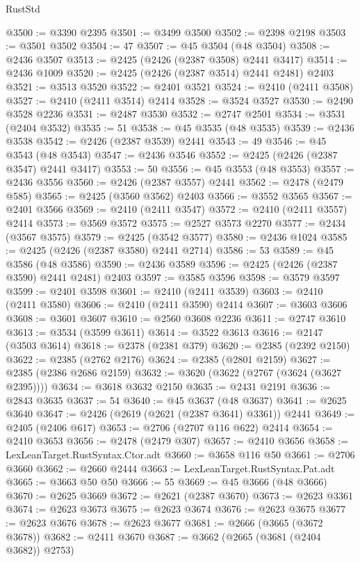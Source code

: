 \begin{lexlean}{RustStd}
\begin{coremodule}
@3500 := @3390 @2395
@3501 := @3499 @3500
@3502 := @2398 @2198
@3503 := @3501 @3502
@3504 := 47
@3507 := @45 @3504 (@48 @3504)
@3508 := @2436 @3507
@3513 := @2425 (@2426 (@2387 @3508) @2441 @3417)
@3514 := @2436 @1009
@3520 := @2425 (@2426 (@2387 @3514) @2441 @2481) @2403
@3521 := @3513 @3520
@3522 := @2401 @3521
@3524 := @2410 (@2411 @3508)
@3527 := @2410 (@2411 @3514) @2414
@3528 := @3524 @3527
@3530 := @2490 @3528 @2236
@3531 := @2487 @3530
@3532 := @2747 @2501
@3534 := @3531 (@2404 @3532)
@3535 := 51
@3538 := @45 @3535 (@48 @3535)
@3539 := @2436 @3538
@3542 := @2426 (@2387 @3539) @2441
@3543 := 49
@3546 := @45 @3543 (@48 @3543)
@3547 := @2436 @3546
@3552 := @2425 (@2426 (@2387 @3547) @2441 @3417)
@3553 := 50
@3556 := @45 @3553 (@48 @3553)
@3557 := @2436 @3556
@3560 := @2426 (@2387 @3557) @2441
@3562 := @2478 (@2479 @585)
@3565 := @2425 (@3560 @3562) @2403
@3566 := @3552 @3565
@3567 := @2401 @3566
@3569 := @2410 (@2411 @3547)
@3572 := @2410 (@2411 @3557) @2414
@3573 := @3569 @3572
@3575 := @2527 @3573 @2270
@3577 := @2434 (@3567 @3575)
@3579 := @2425 (@3542 @3577)
@3580 := @2436 @1024
@3585 := @2425 (@2426 (@2387 @3580) @2441 @2714)
@3586 := 53
@3589 := @45 @3586 (@48 @3586)
@3590 := @2436 @3589
@3596 := @2425 (@2426 (@2387 @3590) @2441 @2481) @2403
@3597 := @3585 @3596
@3598 := @3579 @3597
@3599 := @2401 @3598
@3601 := @2410 (@2411 @3539)
@3603 := @2410 (@2411 @3580)
@3606 := @2410 (@2411 @3590) @2414
@3607 := @3603 @3606
@3608 := @3601 @3607
@3610 := @2560 @3608 @2236
@3611 := @2747 @3610
@3613 := @3534 (@3599 @3611)
@3614 := @3522 @3613
@3616 := @2147 (@3503 @3614)
@3618 := @2378 (@2381 @379)
@3620 := @2385 (@2392 @2150)
@3622 := @2385 (@2762 @2176)
@3624 := @2385 (@2801 @2159)
@3627 := @2385 (@2386 @2686 @2159)
@3632 := @3620 (@3622 (@2767 (@3624 (@3627 @2395))))
@3634 := @3618 @3632 @2150
@3635 := @2431 @2191
@3636 := @2843 @3635
@3637 := 54
@3640 := @45 @3637 (@48 @3637)
@3641 := @2625 @3640
@3647 := @2426 (@2619 (@2621 (@2387 @3641) @3361)) @2441
@3649 := @2405 (@2406 @617)
@3653 := @2706 (@2707 @116 @622) @2414
@3654 := @2410 @3653
@3656 := @2478 (@2479 @307)
@3657 := @2410 @3656
@3658 := LexLeanTarget.RustSyntax.Ctor.adt
@3660 := @3658 @116 @50
@3661 := @2706 @3660
@3662 := @2660 @2444
@3663 := LexLeanTarget.RustSyntax.Pat.adt
@3665 := @3663 @50 @50
@3666 := 55
@3669 := @45 @3666 (@48 @3666)
@3670 := @2625 @3669
@3672 := @2621 (@2387 @3670)
@3673 := @2623 @3361
@3674 := @2623 @3673
@3675 := @2623 @3674
@3676 := @2623 @3675
@3677 := @2623 @3676
@3678 := @2623 @3677
@3681 := @2666 (@3665 (@3672 @3678))
@3682 := @2411 @3670
@3687 := @3662 (@2665 (@3681 (@2404 @3682)) @2753)

\end{coremodule}
\end{lexlean}
